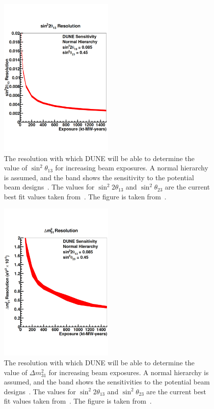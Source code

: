 \begin{figure}
  \centering
  \includegraphics[width=0.5\textwidth]{DUNETheta13Res}
  \caption[The resolution with which DUNE will be able to determine the value of $\sin^{2}\theta_{13}$ for increasing beam exposures]
          {The resolution with which DUNE will be able to determine the value of $\sin^{2}\theta_{13}$ for increasing beam exposures. A normal hierarchy is assumed, and the band shows the sensitivity to the potential beam designs~\citep{DUNECDR_V3}. The values for $\sin^{2}2\theta_{13}$ and $\sin^{2}\theta_{23}$ are the current best fit values taken from~\citep{NuFit2014}. The figure is taken from~\citep{DUNECDR_V2}.}
  \label{fig:DUNETheta13Res}
\end{figure}

\begin{figure}
  \centering
  \includegraphics[width=0.5\textwidth]{DUNEDeltaMRes}
  \caption[The resolution with which DUNE will be able to determine the value of $\Delta m^{2}_{31}$ for increasing beam exposures]
          {The resolution with which DUNE will be able to determine the value of $\Delta m^{2}_{31}$ for increasing beam exposures. A normal hierarchy is assumed, and the band shows the sensitivities to the potential beam designs~\citep{DUNECDR_V3}. The values for $\sin^{2}2\theta_{13}$ and $\sin^{2}\theta_{23}$ are the current best fit values taken from~\citep{NuFit2014}. The figure is taken from~\citep{DUNECDR_V2}.}
  \label{fig:DUNEDeltaMRes}
\end{figure}

